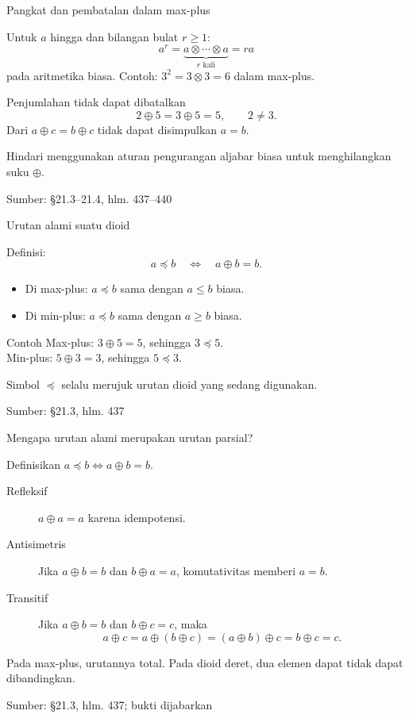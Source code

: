 \documentclass[aspectratio=169,11pt]{beamer}
\newcommand{\source}[1]{%
    \vfill
    \hfill{\tiny\color{gray}Sumber: #1}
}
\begin{document}
\begin{frame}{Pangkat dan pembatalan dalam max-plus}

Untuk $a$ hingga dan bilangan bulat $r\ge1$:
\[
a^r=\underbrace{a\otimes\cdots\otimes a}_{r\text{ kali}}=ra
\]
pada aritmetika biasa. Contoh: $3^2=3\otimes3=6$ dalam max-plus.
\begin{block}{Penjumlahan tidak dapat dibatalkan}
\[
2\oplus5=3\oplus5=5,\qquad 2\ne3.
\]
Dari $a\oplus c=b\oplus c$ tidak dapat disimpulkan $a=b$.
\end{block}
Hindari menggunakan aturan pengurangan aljabar biasa untuk menghilangkan suku $\oplus$.

\source{\S21.3--21.4, hlm. 437--440}
\end{frame}
\begin{frame}{Urutan alami suatu dioid}


Definisi:
\[
a\preceq b\quad\Longleftrightarrow\quad a\oplus b=b.
\]
\begin{itemize}
\item Di max-plus: $a\preceq b$ sama dengan $a\le b$ biasa.
\item Di min-plus: $a\preceq b$ sama dengan $a\ge b$ biasa.
\end{itemize}
\begin{exampleblock}{Contoh}
Max-plus: $3\oplus5=5$, sehingga $3\preceq5$.\\
Min-plus: $5\oplus3=3$, sehingga $5\preceq3$.
\end{exampleblock}
Simbol $\preceq$ selalu merujuk urutan dioid yang sedang digunakan.

\source{\S21.3, hlm. 437}

\end{frame}
\begin{frame}{Mengapa urutan alami merupakan urutan parsial?}

Definisikan $a\preceq b\iff a\oplus b=b$.
\begin{description}
\item[Refleksif] $a\oplus a=a$ karena idempotensi.
\item[Antisimetris] Jika $a\oplus b=b$ dan $b\oplus a=a$,
komutativitas memberi $a=b$.
\item[Transitif] Jika $a\oplus b=b$ dan $b\oplus c=c$, maka
\[
a\oplus c=a\oplus(b\oplus c)
=(a\oplus b)\oplus c=b\oplus c=c.
\]
\end{description}
Pada max-plus, urutannya total. Pada dioid deret,
dua elemen dapat tidak dapat dibandingkan.

\source{\S21.3, hlm. 437; bukti dijabarkan}
\end{frame}
\end{document}
